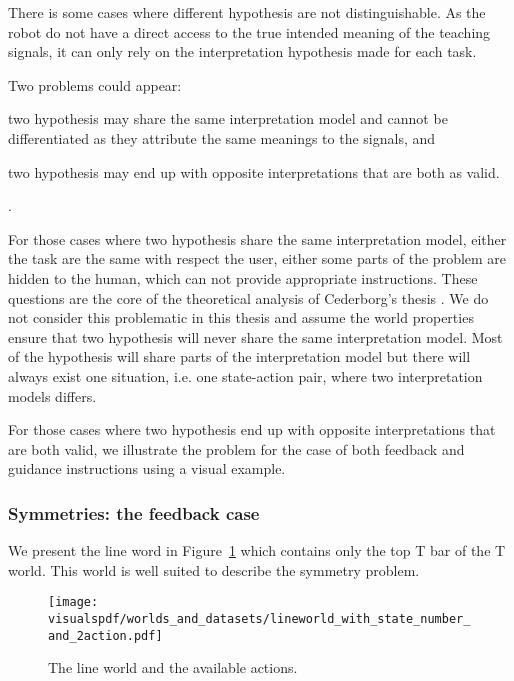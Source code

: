 There is some cases where different hypothesis are not distinguishable. As the robot do not have a direct access to the true intended meaning of the teaching signals, it can only rely on the interpretation hypothesis made for each task.

Two problems could appear: \begin{inparaenum}[(a)] \item two hypothesis may share the same interpretation model and cannot be differentiated as they attribute the same meanings to the signals, and \item two hypothesis may end up with opposite interpretations that are both as valid. \end{inparaenum}.

For those cases where two hypothesis share the same interpretation model, either the task are the same with respect the user, either some parts of the problem are hidden to the human, which can not provide appropriate instructions. These questions are the core of the theoretical analysis of Cederborg's thesis \cite{cederborg2014thesis,cederborg2014social}. We do not consider this problematic in this thesis and assume the world properties ensure that two hypothesis will never share the same interpretation model. Most of the hypothesis will share parts of the interpretation model but there will always exist one situation, i.e. one state-action pair, where two interpretation models differs.

For those cases where two hypothesis end up with opposite interpretations that are both valid, we illustrate the problem for the case of both feedback and guidance instructions using a visual example.

\subsubsection*{Symmetries: the feedback case}

We present the line word in Figure~\ref{fig:lineworld} which contains only the top T bar of the T world. This world is well suited to describe the symmetry problem. 

\begin{figure}[!htbp]
  \centering
  \texttt{[image: \\visualspdf/worlds\_and\_datasets/lineworld\_with\_state\_number\_and\_2action.pdf]}
  \caption{The line world and the available actions.}
  \label{fig:lineworld}
\end{figure}

